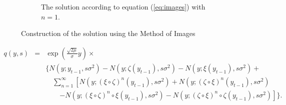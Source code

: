 \begin{figure}[htbp]
\begin{subfigure}[t]{0.3\textwidth}
                \caption{The solution according to equation (\ref{eq:images}) with $n=1$. }
                \label{fig:g3}
        \end{subfigure}
        \caption{Construction of the solution using the Method of Images}\label{fig:animals}
\end{figure}

\begin{eqnarray}
	q(y,s) &=& \exp\left( \frac{\sqrt{2\mu}}{\sigma} y \right) \times \nonumber \\
		&& \Bigg\{ N( y ; y_{t-1}, s\sigma^2) - N( y ; \zeta(y_{t-1}), s\sigma^2) - N( y ; \xi(y_{t-1}), s\sigma^2) + \nonumber \\
		&& \quad \sum_{n=1}^\infty \left[ N( y ; (\xi \circ \zeta)^n (y_{t-1}), s\sigma^2) + N(y ; (\zeta \circ \xi)^n (y_{t-1}), s\sigma^2 ) \right. \nonumber \\
		& & \qquad \left. -  N( y ; (\xi \circ \zeta)^n \circ \xi (y_{t-1}), s\sigma^2) - N( y ; (\zeta \circ \xi)^n \circ \zeta (y_{t-1}), s\sigma^2) \right] \Bigg\} . \label{eq:q-final-images} 
\end{eqnarray}

